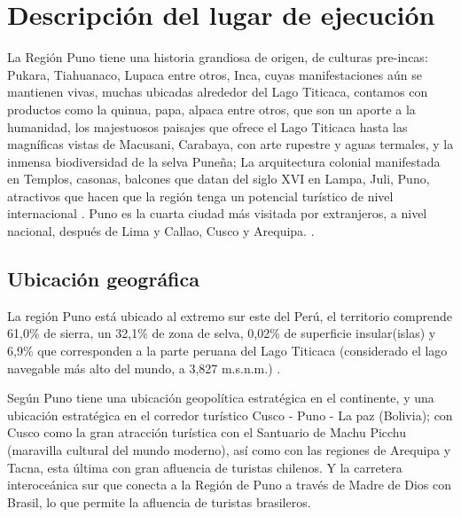 \section{Descripción del lugar de ejecución}
La Región Puno tiene una historia grandiosa de origen, de culturas pre-incas: Pukara, Tiahuanaco, Lupaca entre otros, Inca, cuyas manifestaciones aún se mantienen vivas, muchas ubicadas alrededor del Lago Titicaca, contamos con productos como la quinua, papa, alpaca entre otros, que son un aporte a la humanidad, los majestuosos paisajes que ofrece el Lago Titicaca hasta las magníficas vistas de Macusani, Carabaya, con arte rupestre y aguas termales, y la inmensa biodiversidad de la selva Puneña; La arquitectura colonial manifestada en Templos, casonas, balcones que datan del siglo XVI en Lampa, Juli, Puno, atractivos que hacen que la región tenga un potencial turístico de nivel internacional \cite{2011PlanPERTUR}. Puno es la cuarta ciudad más visitada por extranjeros, a nivel nacional, después de Lima y Callao, Cusco y Arequipa. \cite{2016CarpetaPeru}.

\subsection{Ubicación geográfica}
La región Puno está ubicado al extremo sur este del Perú, el territorio comprende 61,0\% de sierra, un 32,1\% de zona de selva, 0,02\% de superficie insular(islas) y 6,9\% que corresponden a la parte peruana del Lago Titicaca (considerado el lago navegable más alto del mundo, a 3,827 m.s.n.m.) \cite{2016CarpetaPeru}.

Según  Puno tiene una ubicación geopolítica estratégica en el continente, y una ubicación estratégica en el corredor turístico Cusco - Puno - La paz (Bolivia); con Cusco como la gran atracción turística con el Santuario de Machu Picchu (maravilla cultural del mundo moderno), así como con las regiones de Arequipa y Tacna, esta última con gran afluencia de turistas chilenos. Y la carretera interoceánica sur que conecta a la Región de Puno a través de Madre de Dios con Brasil, lo que permite la afluencia de turistas brasileros.

